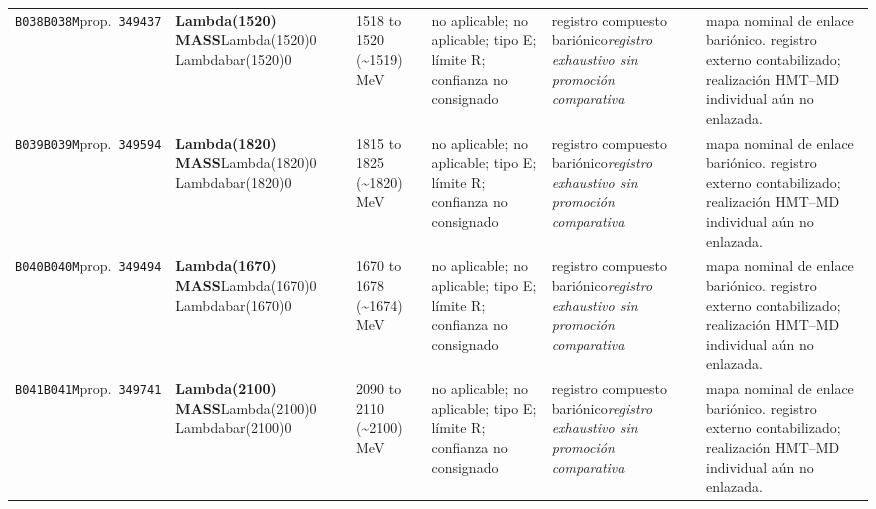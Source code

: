 \begin{landscape}
\begin{longtable}{L{1.85cm}L{4.45cm}L{2.35cm}L{4.05cm}L{3.35cm}L{7.15cm}}
\texttt{B038}\newline \texttt{B038M}\newline prop.\ \texttt{349437} & \textbf{Lambda(1520) MASS}\newline Lambda(1520)0 \textbar{}\allowbreak{} Lambdabar(1520)0 & 1518 to 1520 (\textasciitilde{}1519)\,MeV & no aplicable; no aplicable; tipo E; límite R; confianza no consignado & registro compuesto bariónico\newline \emph{registro exhaustivo sin promoción comparativa} & mapa nominal de enlace bariónico. registro externo contabilizado; realización HMT--MD individual aún no enlazada. \\
\texttt{B039}\newline \texttt{B039M}\newline prop.\ \texttt{349594} & \textbf{Lambda(1820) MASS}\newline Lambda(1820)0 \textbar{}\allowbreak{} Lambdabar(1820)0 & 1815 to 1825 (\textasciitilde{}1820)\,MeV & no aplicable; no aplicable; tipo E; límite R; confianza no consignado & registro compuesto bariónico\newline \emph{registro exhaustivo sin promoción comparativa} & mapa nominal de enlace bariónico. registro externo contabilizado; realización HMT--MD individual aún no enlazada. \\
\texttt{B040}\newline \texttt{B040M}\newline prop.\ \texttt{349494} & \textbf{Lambda(1670) MASS}\newline Lambda(1670)0 \textbar{}\allowbreak{} Lambdabar(1670)0 & 1670 to 1678 (\textasciitilde{}1674)\,MeV & no aplicable; no aplicable; tipo E; límite R; confianza no consignado & registro compuesto bariónico\newline \emph{registro exhaustivo sin promoción comparativa} & mapa nominal de enlace bariónico. registro externo contabilizado; realización HMT--MD individual aún no enlazada. \\
\texttt{B041}\newline \texttt{B041M}\newline prop.\ \texttt{349741} & \textbf{Lambda(2100) MASS}\newline Lambda(2100)0 \textbar{}\allowbreak{} Lambdabar(2100)0 & 2090 to 2110 (\textasciitilde{}2100)\,MeV & no aplicable; no aplicable; tipo E; límite R; confianza no consignado & registro compuesto bariónico\newline \emph{registro exhaustivo sin promoción comparativa} & mapa nominal de enlace bariónico. registro externo contabilizado; realización HMT--MD individual aún no enlazada. \\

\end{longtable}
\end{landscape}
